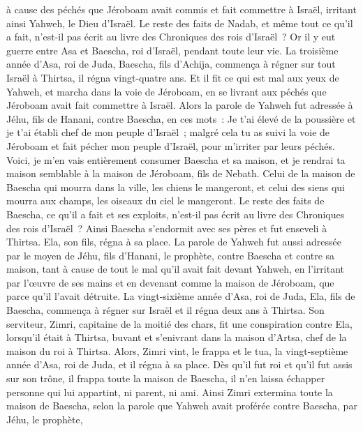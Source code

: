 \begin{multicols}{2}
à cause des péchés que Jéroboam avait commis et fait commettre à Israël, irritant ainsi Yahweh, le Dieu d'Israël.
Le reste des faits de Nadab, et même tout ce qu'il a fait, n'est-il pas écrit au livre des Chroniques des rois d'Israël~?
Or il y eut guerre entre Asa et Baescha, roi d'Israël, pendant toute leur vie.
La troisième année d'Asa, roi de Juda, Baescha, fils d'Achija, commença à régner sur tout Israël à Thirtsa, il régna vingt-quatre ans.
Et il fit ce qui est mal aux yeux de Yahweh, et marcha dans la voie de Jéroboam, en se livrant aux péchés que Jéroboam avait fait commettre à Israël.
\VerseOne{}Alors la parole de Yahweh fut adressée à Jéhu, fils de Hanani, contre Baescha, en ces mots~:
Je t'ai élevé de la poussière et je t'ai établi chef de mon peuple d'Israël~; malgré cela tu as suivi la voie de Jéroboam et fait pécher mon peuple d'Israël, pour m'irriter par leurs péchés.
Voici, je m'en vais entièrement consumer Baescha et sa maison, et je rendrai ta maison semblable à la maison de Jéroboam, fils de Nebath.
Celui de la maison de Baescha qui mourra dans la ville, les chiens le mangeront, et celui des siens qui mourra aux champs, les oiseaux du ciel le mangeront.
Le reste des faits de Baescha, ce qu'il a fait et ses exploits, n'est-il pas écrit au livre des Chroniques des rois d'Israël~?
Ainsi Baescha s'endormit avec ses pères et fut enseveli à Thirtsa. Ela, son fils, régna à sa place.
La parole de Yahweh fut aussi adressée par le moyen de Jéhu, fils d'Hanani, le prophète, contre Baescha et contre sa maison, tant à cause de tout le mal qu'il avait fait devant Yahweh, en l'irritant par l'œuvre de ses mains et en devenant comme la maison de Jéroboam, que parce qu'il l'avait détruite.
La vingt-sixième année d'Asa, roi de Juda, Ela, fils de Baescha, commença à régner sur Israël et il régna deux ans à Thirtsa.
Son serviteur, Zimri, capitaine de la moitié des chars, fit une conspiration contre Ela, lorsqu'il était à Thirtsa, buvant et s'enivrant dans la maison d'Artsa, chef de la maison du roi à Thirtsa.
Alors, Zimri vint, le frappa et le tua, la vingt-septième année d'Asa, roi de Juda, et il régna à sa place.
Dès qu'il fut roi et qu'il fut assis sur son trône, il frappa toute la maison de Baescha, il n'en laissa échapper personne qui lui appartint, ni parent, ni ami.
Ainsi Zimri extermina toute la maison de Baescha, selon la parole que Yahweh avait proférée contre Baescha, par Jéhu, le prophète,

\end{multicols}
